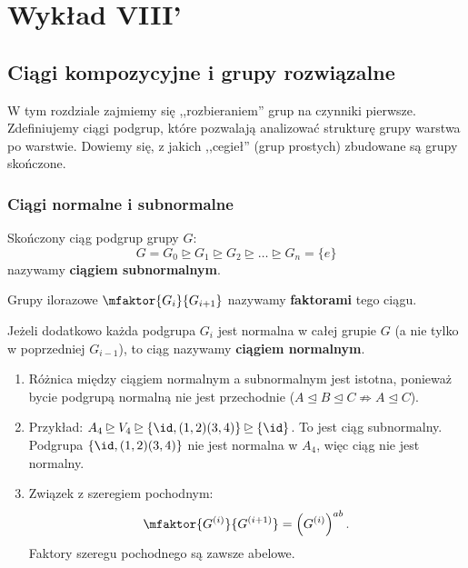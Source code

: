 \chapter{Wykład VIII'}

\section{Ciągi kompozycyjne i grupy rozwiązalne}

\begin{context}
	W tym rozdziale zajmiemy się ,,rozbieraniem'' grup na czynniki pierwsze. Zdefiniujemy ciągi podgrup, które pozwalają analizować strukturę grupy warstwa po warstwie. Dowiemy się, z jakich ,,cegieł'' (grup prostych) zbudowane są grupy skończone.
\end{context}

\subsection{Ciągi normalne i subnormalne}

\begin{definition}
	Skończony ciąg podgrup grupy $G$:
	\[ G = G_0 \unrhd G_1 \unrhd G_2 \unrhd \ldots \unrhd G_n = \{e\} \]
	nazywamy \textbf{ciągiem subnormalnym}.
	
	Grupy ilorazowe $\mfaktor{G_{i}}{G_{i+1}}$ nazywamy \textbf{faktorami} tego ciągu.
	
	Jeżeli dodatkowo każda podgrupa $G_i$ jest normalna w całej grupie $G$ (a nie tylko w poprzedniej $G_{i-1}$), to ciąg nazywamy \textbf{ciągiem normalnym}.
\end{definition} 

\begin{remark}
	\begin{enumerate}[label=\arabic*)]
		\item Różnica między ciągiem normalnym a subnormalnym jest istotna, ponieważ bycie podgrupą normalną nie jest przechodnie ($A \unlhd B \unlhd C \nRightarrow A \unlhd C$).
		\item Przykład: $A_4 \unrhd V_4 \unrhd \{ \id, (1,2)(3,4) \} \unrhd \{\id\}$.
		To jest ciąg subnormalny. Podgrupa $\{ \id, (1,2)(3,4) \}$ nie jest normalna w $A_4$, więc ciąg nie jest normalny.
		\item Związek z szeregiem pochodnym:
		\[ \mfaktor{G^{(i)}}{G^{(i+1)}} = \left( G^{(i)} \right)^{ab}. \]
		Faktory szeregu pochodnego są zawsze abelowe.
	\end{enumerate}
\end{remark} 

